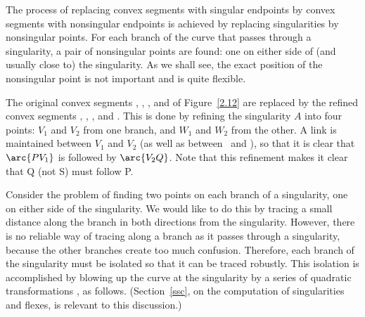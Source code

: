 The process of replacing convex segments with singular endpoints
by convex segments with nonsingular endpoints 
is achieved by replacing singularities by nonsingular points.
For each branch of the curve that passes through a singularity, 
a pair of nonsingular points are found: one on either side of (and usually close to) 
the singularity.
As we shall see, the exact position of the nonsingular point is not important and
is quite flexible.

\begin{example}
\label{eg-pseudo}
The original convex segments , , , and 
of Figure~\ref{2.12} are replaced by the refined convex segments
, , , and .
This is done by refining the singularity $A$ into four points:
$V_{1}$ and $V_{2}$ from one branch, and $W_{1}$ and $W_{2}$ from the other.
A link is maintained between $V_{1}$ and $V_{2}$ (as well as between \wo\ and \wt),
so that it is clear that $\arc{PV_{1}}$ is followed by $\arc{V_{2}Q}$.
Note that this refinement makes it clear that Q (not S) must follow P.
\end{example}


Consider the problem of finding two points on each branch of a singularity, one on either 
side of the singularity.
We would like to do this by tracing \cite{bhhl} a small distance along the branch
in both directions from the singularity.
However, there is no reliable way of tracing along a branch as it passes
through a singularity, because the other branches create too much confusion.
Therefore, each branch of the singularity must be isolated so that it can 
be traced robustly.
This isolation is accomplished by blowing up the curve at the singularity by 
a series of quadratic transformations \cite{bhhl,walker,abhy}, as follows.
(Section~\ref{ssc}, on the computation
of singularities and flexes, is relevant to this discussion.)

